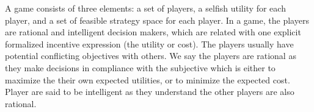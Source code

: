 


A game consists of three elements: a set of players, a selfish utility for each player, and a set of feasible strategy space for each player.
In a game, the players are rational and intelligent decision makers, which are related with one explicit formalized incentive expression (the utility or cost).
The players usually have potential conflicting objectives with others.
We say the players are rational as they make decisions in compliance with the subjective which is either to maximize the their own expected utilities, or to minimize the expected cost.
Player are said to be intelligent as they understand the other players are also rational.

